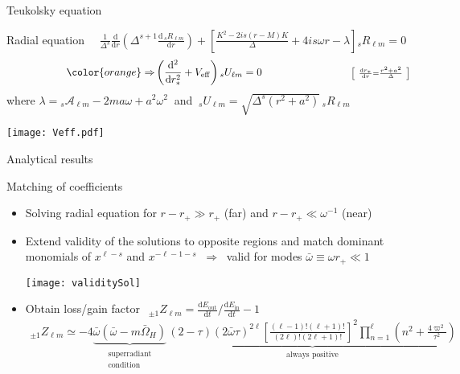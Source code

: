 \documentclass[9pt]{beamer}
\newcommand{\dd}{\mathrm{d}}
\newcommand{\uu}[3][]{ {}_{#1} #2_{#3} }
\begin{document}
\begin{frame}{Teukolsky equation}
	
	\begin{block}{Radial equation $\quad \frac{1}{\Delta^s} \frac{\dd}{\dd r} \left( \Delta^{s+1} \frac{\dd\, {}_{s}R_{\ell m}}{\dd r} \right)
+ \left[ \frac{K^2 - 2 i s (r-M)K}{\Delta} + 4 i s \omega r -\lambda \right] {}_{s}R_{\ell m} = 0$}
		$$ \hspace*{2cm} {\color{orange}\Rightarrow} \left( \frac{\dd^2}{\dd r_{*}^2} + V_\mathrm{eff} \right) {}_{s}U_{\ell m} = 0 \hspace*{3cm} {\scriptstyle \left[~\frac{\dd r_*}{\dd r} = \frac{r^2+a^2}{\Delta}~\right] } $$
		where $\lambda = {}_{s}\mathscr{A}_{\ell m} - 2 m a \omega + a^2 \omega^2~$ and $~{}_{s}U_{\ell m}=\sqrt{\Delta^s (r^2 + a^2)} \,{}_{s}R_{\ell m}~$
		
		\texttt{[image: Veff.pdf]}
	\end{block}
	
\end{frame}




\begin{frame}{Analytical results}
	
	\begin{block}{Matching of coefficients}
		\begin{itemize}
			\setlength\itemsep{0.5em}
			\item Solving radial equation for $r - r_+ \gg r_+$ (far) and $r - r_+ \ll \omega^{-1}$ (near)
			
			\item Extend validity of the solutions to opposite regions and match dominant monomials of $x^{\ell-s}$ and $x^{-\ell-1-s}$ $~\Rightarrow~$ valid for modes $\bar{\omega}\equiv \omega r_+ \ll 1$
			\begin{center}
				\texttt{[image: validitySol]}
			\end{center}	
		
			\item Obtain loss/gain factor $~\boxed{\displaystyle ~{}_{\pm 1}Z_{\ell m} = \frac{\dd E_\mathrm{out}}{\dd t}\bigg/\frac{\dd E_\mathrm{in}}{\dd t} - 1~}$
			\begin{align*}
			\uu[\pm1]{Z}{\ell m} \simeq  - 4 \underbrace{\bar{\omega} (\bar{\omega} - m \bar{\Omega}_H)}_{\substack{\text{superradiant}\\\text{condition}}} \,\underbrace{(2-\tau)(2\bar{\omega} \tau)^{2\ell} \left[\frac{(\ell-1)! (\ell+1)!}{(2\ell)! (2\ell+1)!}\right]^2 \prod_{n=1}^{\ell} \left(n^2 + \frac{4 \varpi^2}{\tau^2} \right)}_\text{always positive}
			\end{align*}
		\end{itemize}
	\end{block}
	
\end{frame}
\end{document}
